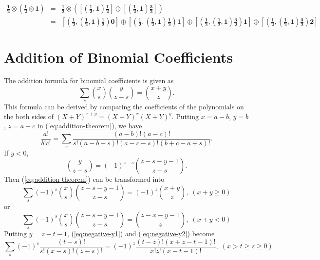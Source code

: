 \documentclass{article}
\begin{document}
\begin{eqnarray}
\mathbf{\frac{1}{2}} \otimes \left( \mathbf{\frac{1}{2}}  \otimes \mathbf{1} \right) 
    & = & \mathbf{\frac{1}{2} \otimes\left(\left[\left(\frac{1}{2}, 1\right) \frac{1}{2} \right] \oplus \left[\left(\frac{1}{2}, 1 \right) \frac{3}{2} \right]\right) }\nonumber\\
    & = & \mathbf{ \left[\left(\frac{1}{2}, \left(\frac{1}{2}, 1 \right) \frac{1}{2} \right) 0\right] \oplus \left[\left(\frac{1}{2}, \left(\frac{1}{2}, 1\right) \frac{1}{2} \right) 1 \right] \oplus \left[\left( \frac{1}{2}, \left(\frac{1}{2}, 1 \right) \frac{3}{2} \right) 1 \right] \oplus \left[\left(\frac{1}{2}, \left(\frac{1}{2}, 1 \right) \frac{3}{2} \right) 2 \right] }\nonumber
\end{eqnarray}
\appendix
\section{Addition of Binomial Coefficients}
\label{sec-6}
The addition formula for binomial coefficients is given as
\begin{equation}
\label{eq:addition-theorem}
\sum_{s} \binom{x}{s} \binom{y}{z-s} = \binom{x+y}{z}.
\end{equation}
This formula can be derived by comparing the coefficients of the polynomials on the both sides of $(X+Y)^{x+y}=(X+Y)^{x}(X+Y)^{y}$.
Putting $x = a-b$, $y=b$, $z=a-c$ in (\ref{eq:addition-theorem}), we have
\begin{equation}
\label{fml:triple-formula}
\frac{a!}{b!c!}= \sum_{s} \frac{(a-b)!(a-c)!}{s!(a-b-s)!(a-c-s)!(b+c-a+s)!}.
\end{equation}
If $y < 0$, 
\begin{equation}
\label{sub:negative-y}
\binom{y}{z-s} = (-1)^{z-s} \binom{z-s-y-1}{z-s}.
\end{equation}
Then (\ref{eq:addition-theorem}) can be transformed into
\begin{equation}
\label{eq:negative-y1}
\sum_{s}(-1)^{s} \binom{x}{s} \binom{z-s-y-1}{z-s} = (-1)^{z}\binom{x+y}{z}, \; (x+y \ge 0)
\end{equation}
or
\begin{equation}
\label{eq:negative-y2}
\sum_{s}(-1)^{s} \binom{x}{s} \binom{z-s-y-1}{z-s} = \binom{z-x-y-1}{z}, \;(x+y < 0)
\end{equation}
Putting $y=z-t-1$, (\ref{eq:negative-y1}) and (\ref{eq:negative-y2}) become
\begin{equation}
\label{ }
\sum_{s} (-1)^{s}\frac{(t-s)!}{s!(x-s)!(z-s)!}= (-1)^z \frac{(t-z)!(x+z-t-1)!}{x!z!(x-t-1)!}, \;( x > t \ge z \ge 0).
\end{equation}
\end{document}
